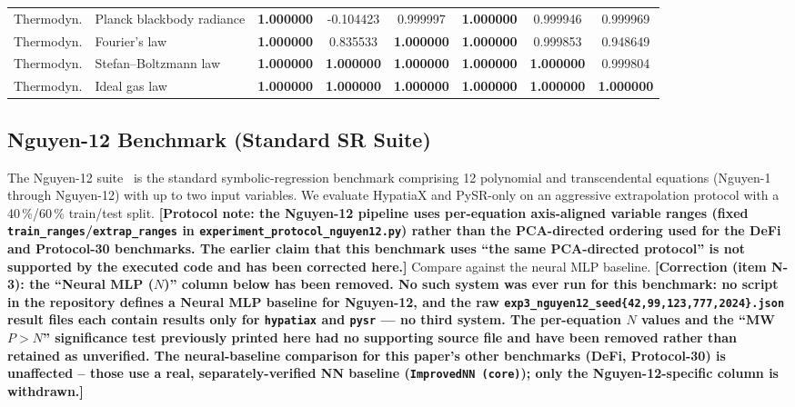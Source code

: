 \documentclass[twoside,11pt]{article}
\begin{document}
{\begin{longtable}{p{1.9cm}p{4.3cm}cccccc}
Thermodyn. & Planck blackbody radiance & \textbf{1.000000} & -0.104423 & 0.999997 & \textbf{1.000000} & 0.999946 & 0.999969 \\
Thermodyn. & Fourier's law & \textbf{1.000000} & 0.835533 & \textbf{1.000000} & \textbf{1.000000} & 0.999853 & 0.948649 \\
Thermodyn. & Stefan--Boltzmann law & \textbf{1.000000} & \textbf{1.000000} & \textbf{1.000000} & \textbf{1.000000} & \textbf{1.000000} & 0.999804 \\
Thermodyn. & Ideal gas law & \textbf{1.000000} & \textbf{1.000000} & \textbf{1.000000} & \textbf{1.000000} & \textbf{1.000000} & \textbf{1.000000} \\
\bottomrule
\end{longtable}}

\subsection{Nguyen-12 Benchmark (Standard SR Suite)}\label{subsec:nguyen12-benchmark-standard-sr-suite}
\label{sec:nguyen12}

The Nguyen-12 suite~\citep{uy2011semantically} is the standard symbolic-regression
benchmark comprising 12 polynomial and transcendental equations (Nguyen-1 through
Nguyen-12) with up to two input variables.  We evaluate HypatiaX and PySR-only on
an aggressive extrapolation protocol with a 40\,\%/60\,\% train/test split.
\textbf{[Protocol note: the Nguyen-12 pipeline uses per-equation axis-aligned
variable ranges (fixed \texttt{train\_ranges}/\texttt{extrap\_ranges} in
\texttt{experiment\_protocol\_nguyen12.py}) rather than the PCA-directed
ordering used for the DeFi and Protocol-30 benchmarks.  The earlier claim that
this benchmark uses ``the same PCA-directed protocol'' is not supported by
the executed code and has been corrected here.]}
Compare against the neural MLP baseline. \textbf{[Correction (item N-3):
the ``Neural MLP ($N$)'' column below has been removed. No such system
was ever run for this benchmark: no script in the repository defines a
Neural MLP baseline for Nguyen-12, and the raw
\texttt{exp3\_nguyen12\_seed\{42,99,123,777,2024\}.json} result files each
contain results only for \texttt{hypatiax} and \texttt{pysr} --- no third
system. The per-equation $N$ values and the ``MW $P{>}N$'' significance
test previously printed here had no supporting source file and have been
removed rather than retained as unverified. The neural-baseline comparison
for this paper's other benchmarks (DeFi, Protocol-30) is unaffected --
those use a real, separately-verified NN baseline
(\texttt{ImprovedNN (core)}); only the Nguyen-12-specific column is
withdrawn.]}
\end{document}
